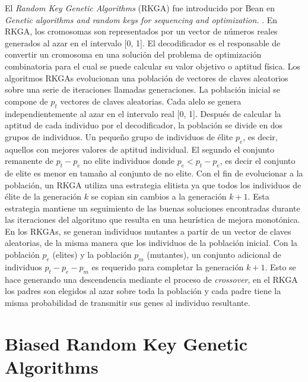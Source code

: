 El \textit{Random Key Genetic Algorithms} (RKGA) fue introducido por Bean en \textit{Genetic algorithms and random keys for sequencing and optimization.} \cite{Bean}. En RKGA, los cromosomas son representados por un vector de números reales generados al azar en el intervalo [0, 1]. El decodificador es el responsable de convertir un cromosoma en una solución del problema de optimización combinatoria para el cual se puede calcular su valor objetivo o aptitud física. Los algoritmos RKGAs evolucionan una población de vectores de claves aleatorios sobre una serie de iteraciones llamadas generaciones. La población inicial se compone de $p_t$ vectores de claves aleatorias. Cada alelo se genera independientemente al azar en el intervalo real [0, 1]. Después de calcular la aptitud de cada individuo por el decodificador, la población se divide en dos grupos de individuos. Un pequeño grupo de individuos de élite $p_e$, es decir, aquellos con mejores valores de aptitud individual. El segundo el conjunto remanente de $p_t-p_e$ no elite individuos donde $p_e<p_t-p_e$, es decir el conjunto de elite es menor en tamaño al conjunto de no elite. Con el fin de evolucionar a la población, un RKGA utiliza una estrategia elitista ya que todos los individuos de élite de la generación $k$ se copian sin cambios a la generación $k + 1$. Esta estrategia mantiene un seguimiento de las buenas soluciones encontradas durante las iteraciones del algoritmo que resulta en una heurística de mejora monotónica. En los RKGAs, se generan individuos mutantes a partir de un vector de claves aleatorias, de la misma manera que los individuos de la población inicial. Con la población $p_e$ (elites) y la población $p_m$ (mutantes), un conjunto adicional de individuos $p_t - p_e - p_m$ es requerido para completar la generación $k+1$. Esto se hace generando una descendencia mediante el proceso de \textit{crossover}, en el RKGA los padres son elegidos al azar sobre toda la población y cada padre tiene la misma probabilidad de transmitir sus genes al individuo resultante.

\section{Biased Random Key Genetic Algorithms}\label{sec:brkga}

